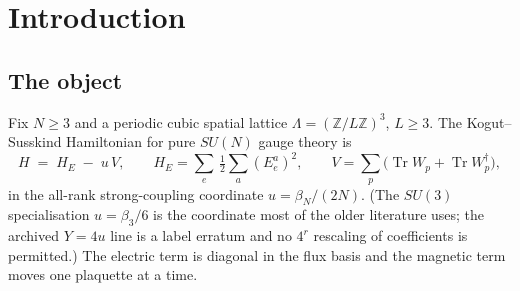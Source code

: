 \documentclass[11pt]{article}
\theoremstyle{definition}
\theoremstyle{remark}
\DeclareMathOperator{\Tr}{Tr}
\newcommand{\dg}{^{\dagger}}
\newcommand{\Z}{\mathbb{Z}}
\begin{document}
\begin{abstract}
\emph{Fourth}, the fourth-order off-axis coefficient, the program's last open
contradiction, is adjudicated --- against both previously recorded kernels. Solving
the shape ansatz over the whole Brillouin zone rather than fitting it at four
points gives $A=5/48$, $B=D=0$ and no residual; the disagreement reduces to the
single scalar $C_{\mathrm{shp}}=-5/96-u-(\rho+\tilde\pi)/2$; and a third,
independent implementation of the corner cluster together with the original
pipeline's own recovered word ledger localises the error to sixteen missing
adjacent-face cube insertion orderings, so
$C_{\mathrm{shp}}=C_{\mathrm{historical}}+25/1024
=-13035490122347/550663802582400$. The $SU(3)$ shape row moves accordingly:
$\beta_3$, $W_4$ and $\lambda_R$ by $25/64$, $\lambda_M$ by $25/128$, with
$\alpha$ and $\lambda_X$ unchanged.

We are explicit about what is \emph{not} established. Every statement here is a
fixed-lattice-spacing statement about an effective operator on the projected
plaquette manifold, downstream of four premises stated in
Section~\ref{sec:premises}. No continuum limit, no physical glueball mass and
no infinite-volume mass gap is claimed; two of the obstructions to the obvious
route are themselves theorems. The off-axis result is an adjudication whose own
declared falsifier --- a direct balanced contraction at $N=3$ --- has not been
performed, the universality lemma is exhausted at three of its four
fourth-order multiplicities, every all-rank statement flows through one
implementation, and no external group has reproduced anything in this program.
Section~\ref{sec:scope} lists each of these with the experiment that would
settle it.
\end{abstract}

\tableofcontents

\section{Introduction}\label{sec:intro}

\subsection{The object}

Fix $N\ge3$ and a periodic cubic spatial lattice $\Lambda=(\Z/L\Z)^3$, $L\ge3$.
The Kogut--Susskind Hamiltonian for pure $SU(N)$ gauge theory is
\begin{equation}\label{eq:ks}
  H \;=\; H_E \;-\; u\,V ,\qquad
  H_E=\sum_{e}\,\tfrac12\sum_a (E_e^a)^2,\qquad
  V=\sum_{p}\bigl(\Tr W_p+\Tr W_p\dg\bigr),
\end{equation}
in the all-rank strong-coupling coordinate $u=\beta_N/(2N)$. (The $SU(3)$
specialisation $u=\beta_3/6$ is the coordinate most of the older literature
uses; the archived $Y=4u$ line is a label erratum and no $4^r$ rescaling of
coefficients is permitted.) The electric term is diagonal in the flux basis and
the magnetic term moves one plaquette at a time.
\end{document}
